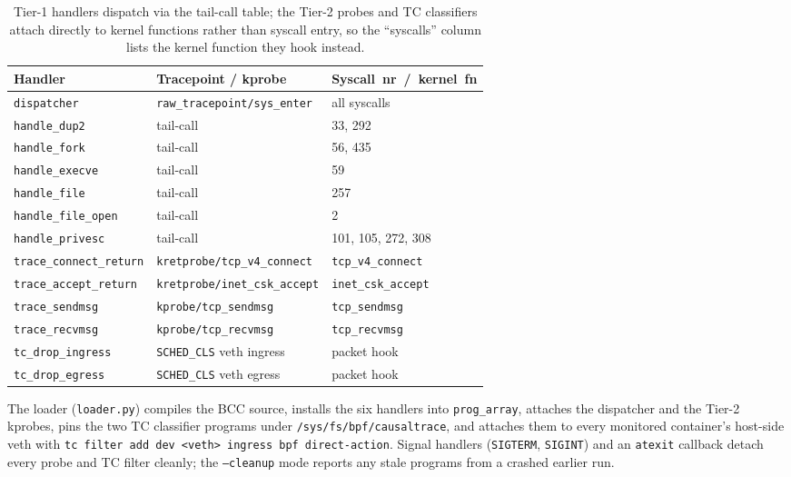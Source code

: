 \begin{table}[h]
\centering
\caption[Handler attachment]{Tier-1 handlers dispatch via the tail-call
table; the Tier-2 probes and TC classifiers attach directly to kernel
functions rather than syscall entry, so the ``syscalls'' column lists
the kernel function they hook instead.}
\label{tab:handler-attach}
\small
\setlength\tabcolsep{4pt}
\begin{tabular}{@{}l l l@{}}
\toprule
Handler & Tracepoint / kprobe & Syscall~nr~/~kernel~fn \\
\midrule
\texttt{dispatcher}             & \texttt{raw\_tracepoint/sys\_enter}   & all syscalls \\
\texttt{handle\_dup2}           & tail-call                             & 33, 292 \\
\texttt{handle\_fork}           & tail-call                             & 56, 435 \\
\texttt{handle\_execve}         & tail-call                             & 59 \\
\texttt{handle\_file}           & tail-call                             & 257 \\
\texttt{handle\_file\_open}     & tail-call                             & 2 \\
\texttt{handle\_privesc}        & tail-call                             & 101, 105, 272, 308 \\
\texttt{trace\_connect\_return} & \texttt{kretprobe/tcp\_v4\_connect}    & \texttt{tcp\_v4\_connect} \\
\texttt{trace\_accept\_return}  & \texttt{kretprobe/inet\_csk\_accept}   & \texttt{inet\_csk\_accept} \\
\texttt{trace\_sendmsg}         & \texttt{kprobe/tcp\_sendmsg}            & \texttt{tcp\_sendmsg} \\
\texttt{trace\_recvmsg}         & \texttt{kprobe/tcp\_recvmsg}            & \texttt{tcp\_recvmsg} \\
\texttt{tc\_drop\_ingress}      & \texttt{SCHED\_CLS} veth ingress       & packet hook \\
\texttt{tc\_drop\_egress}       & \texttt{SCHED\_CLS} veth egress        & packet hook \\
\bottomrule
\end{tabular}
\end{table}

The loader (\texttt{loader.py}) compiles the BCC source, installs the six
handlers into \texttt{prog\_array}, attaches the dispatcher and the Tier-2
kprobes, pins the two TC classifier programs under
\texttt{/sys/fs/bpf/causaltrace}, and attaches them to every monitored
container's host-side veth with \texttt{tc filter add dev <veth> ingress
bpf direct-action}. Signal handlers (\texttt{SIGTERM}, \texttt{SIGINT}) and
an \texttt{atexit} callback detach every probe and TC filter cleanly; the
\texttt{--cleanup} mode reports any stale programs from a crashed earlier
run.


